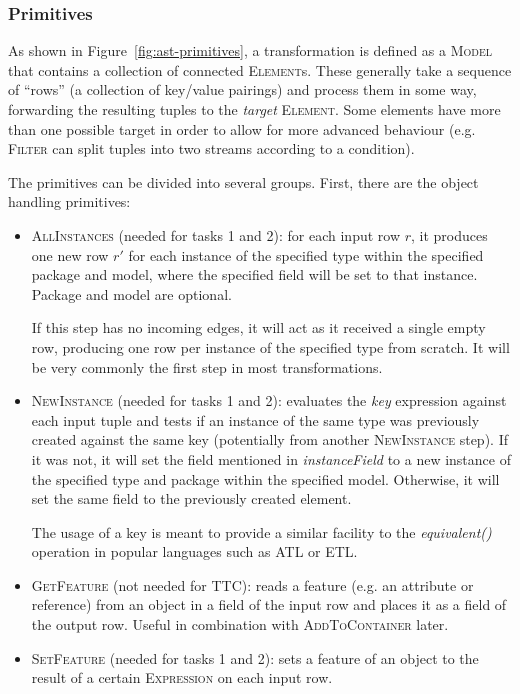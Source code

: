 \documentclass[a4paper]{scrartcl}
\newcommand*{\class}[1]{\textsc{#1}}
\begin{document}
\subsubsection{Primitives}

As shown in Figure~\ref{fig:ast-primitives}, a transformation is
defined as a \class{Model} that contains a collection of connected
\class{Element}s. These generally take a sequence of ``rows'' (a
collection of key/value pairings) and process them in some way,
forwarding the resulting tuples to the \emph{target}
\class{Element}. Some elements have more than one possible target in
order to allow for more advanced behaviour (e.g. \class{Filter} can
split tuples into two streams according to a condition).


The primitives can be divided into several groups. First, there are
the object handling primitives:

\begin{itemize}
\item \class{AllInstances} (needed for tasks 1 and 2): for each input
  row $r$, it produces one new row $r'$ for each instance of the
  specified type within the specified package and model, where the
  specified field will be set to that instance. Package and model are
  optional.

  If this step has no incoming edges, it will act as it received a
  single empty row, producing one row per instance of the specified
  type from scratch. It will be very commonly the first step in most
  transformations.

\item \class{NewInstance} (needed for tasks 1 and 2): evaluates the
  \emph{key} expression against each input tuple and tests if an
  instance of the same type was previously created against the same
  key (potentially from another \class{NewInstance} step). If it was
  not, it will set the field mentioned in \emph{instanceField} to a
  new instance of the specified type and package within the specified
  model. Otherwise, it will set the same field to the previously
  created element.

  The usage of a key is meant to provide a similar facility to the
  \emph{equivalent()} operation in popular languages such as ATL or
  ETL.

\item \class{GetFeature} (not needed for TTC): reads a feature
  (e.g. an attribute or reference) from an object in a field of the
  input row and places it as a field of the output row. Useful in
  combination with \class{AddToContainer} later.

\item \class{SetFeature} (needed for tasks 1 and 2): sets a feature of
  an object to the result of a certain \class{Expression} on each
  input row.
\end{itemize}
\end{document}
